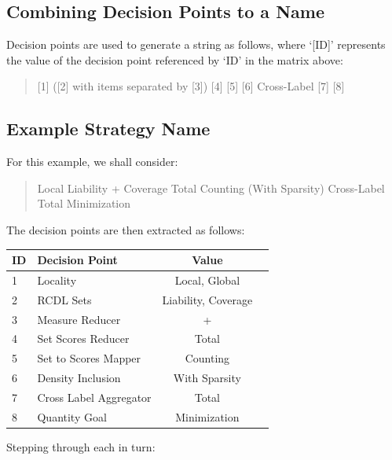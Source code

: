 \documentclass[a4paper,11pt]{report}
\begin{document}
\subsection{Combining Decision Points to a Name}
Decision points are used to generate a string as follows, where `[ID]' represents the value of the decision point referenced by `ID' in the matrix above:

\begin{quote}
[1] ([2] with items separated by [3]) [4] [5] [6] Cross-Label [7] [8]
\end{quote}

\subsection{Example Strategy Name}
For this example, we shall consider:
\begin{quote}
Local Liability + Coverage Total Counting (With Sparsity) Cross-Label Total Minimization
\end{quote}

The decision points are then extracted as follows:

\begin{tabular}{|l|l|c|c|}
\hline 
ID & Decision Point & Value\tabularnewline
\hline 
\hline 
1 & Locality & Local, Global \tabularnewline
\hline 
2 & RCDL Sets & Liability, Coverage \tabularnewline
\hline 
3 & Measure Reducer & + \tabularnewline
\hline 
4 & Set Scores Reducer & Total \tabularnewline
\hline 
5 & Set to Scores Mapper & Counting \tabularnewline
\hline 
6 & Density Inclusion & With Sparsity \tabularnewline
\hline 
7 & Cross Label Aggregator & Total \tabularnewline
\hline 
8 & Quantity Goal & Minimization \tabularnewline
\hline 
\end{tabular}

Stepping through each in turn:
\end{document}
